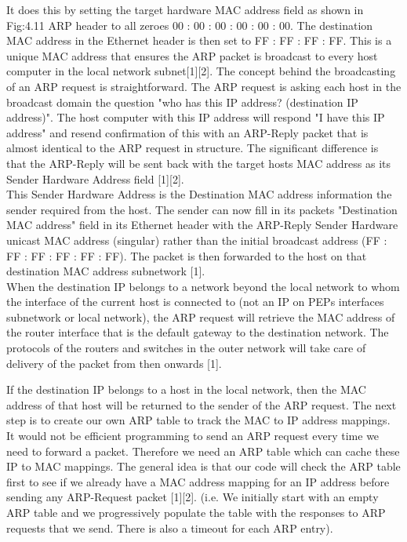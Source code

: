 \documentclass{uathesis}
\begin{document}
It does this by setting the target hardware MAC address field as shown in Fig:4.11 ARP header to all zeroes 00 : 00 : 00 : 00 : 00 : 00. The destination MAC address in the Ethernet header is then set to FF : FF : FF : FF. This is a unique MAC address that ensures the ARP packet is broadcast to every host computer in the local network subnet[1][2]. The concept behind the broadcasting of an ARP request is straightforward. The ARP request is asking each host in the broadcast domain the question "who has this IP address? (destination IP address)". The host computer with this IP address will respond "I have this IP address" and resend confirmation of this with an ARP-Reply packet that is almost identical to the ARP request in structure. The significant difference is that the ARP-Reply will be sent back with the target hosts MAC address as its Sender Hardware Address field [1][2]. \\

This  Sender Hardware Address is the Destination MAC address information the sender required from the host. The sender can now fill in its packets "Destination MAC address" field in its Ethernet header with the ARP-Reply  Sender Hardware unicast MAC address (singular) rather than the initial broadcast address (FF : FF : FF : FF : FF : FF). The packet is then forwarded to the host on that destination MAC address subnetwork [1]. \\

When the destination IP belongs to a network beyond the local network to whom the interface of the current host is connected to  (not an IP on PEPs interfaces subnetwork or local network), the ARP request will retrieve the MAC address of the router interface that is the default gateway to the destination network. The protocols of the routers and switches in the outer network will take care of delivery of the packet from then onwards [1].

If the destination IP belongs to a host in the local network, then the MAC address of that host will be returned to the sender of the ARP request. The next step is to create our own ARP table to track the MAC to IP address mappings. It would not be efficient programming to send an ARP request every time we need to forward a packet. Therefore we need an ARP table which can cache these IP to MAC mappings. The general idea is that our code will check the ARP table first to see if we already have a MAC address mapping for an IP address before sending any ARP-Request packet [1][2]. (i.e. We initially start with an empty ARP table and we progressively populate the table with the responses to ARP requests that we send. There is also a timeout for each ARP entry).
\end{document}
